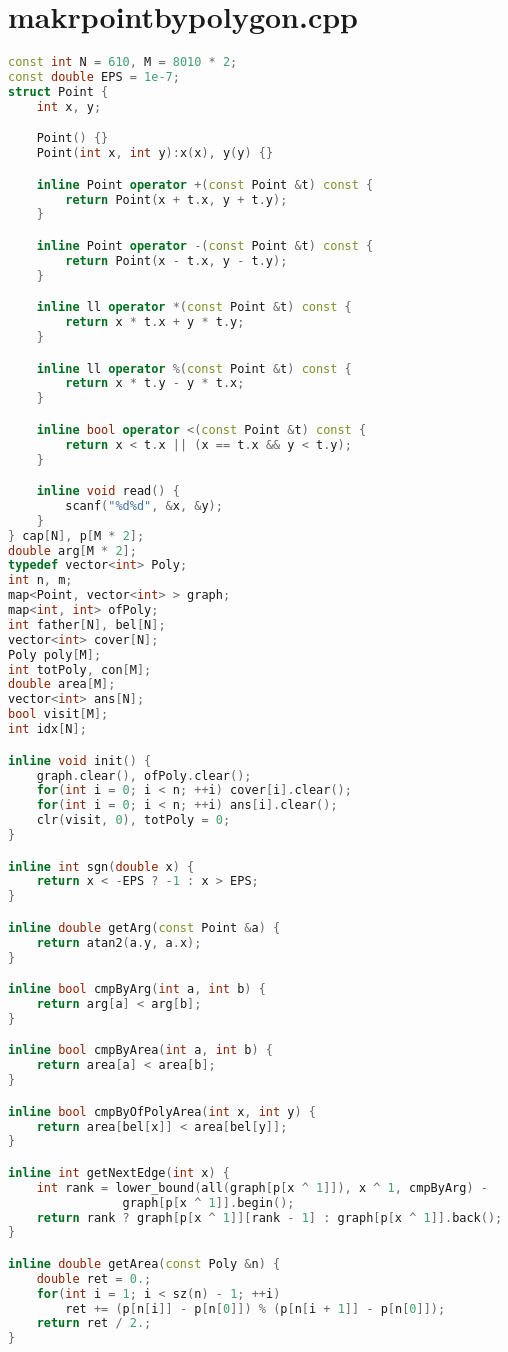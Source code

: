 \section{makrpointbypolygon.cpp}
\begin{lstlisting}[language=c++]
const int N = 610, M = 8010 * 2;
const double EPS = 1e-7;
struct Point {
	int x, y;

	Point() {}
	Point(int x, int y):x(x), y(y) {}

	inline Point operator +(const Point &t) const {
		return Point(x + t.x, y + t.y);
	}

	inline Point operator -(const Point &t) const {
		return Point(x - t.x, y - t.y);
	}

	inline ll operator *(const Point &t) const {
		return x * t.x + y * t.y;
	}

	inline ll operator %(const Point &t) const {
		return x * t.y - y * t.x;
	}

	inline bool operator <(const Point &t) const {
		return x < t.x || (x == t.x && y < t.y);
	}

	inline void read() {
		scanf("%d%d", &x, &y);
	}
} cap[N], p[M * 2];
double arg[M * 2];
typedef vector<int> Poly;
int n, m;
map<Point, vector<int> > graph;
map<int, int> ofPoly;
int father[N], bel[N];
vector<int> cover[N];
Poly poly[M];
int totPoly, con[M];
double area[M];
vector<int> ans[N];
bool visit[M];
int idx[N];

inline void init() {
	graph.clear(), ofPoly.clear();
	for(int i = 0; i < n; ++i) cover[i].clear();
	for(int i = 0; i < n; ++i) ans[i].clear();
	clr(visit, 0), totPoly = 0;
}

inline int sgn(double x) {
	return x < -EPS ? -1 : x > EPS;
}

inline double getArg(const Point &a) {
	return atan2(a.y, a.x);
}

inline bool cmpByArg(int a, int b) {
	return arg[a] < arg[b];
}

inline bool cmpByArea(int a, int b) {
	return area[a] < area[b];
}

inline bool cmpByOfPolyArea(int x, int y) {
	return area[bel[x]] < area[bel[y]];
}

inline int getNextEdge(int x) {
	int rank = lower_bound(all(graph[p[x ^ 1]]), x ^ 1, cmpByArg) - 
				graph[p[x ^ 1]].begin();
	return rank ? graph[p[x ^ 1]][rank - 1] : graph[p[x ^ 1]].back(); 
}

inline double getArea(const Poly &n) {
	double ret = 0.;
	for(int i = 1; i < sz(n) - 1; ++i)
		ret += (p[n[i]] - p[n[0]]) % (p[n[i + 1]] - p[n[0]]);
	return ret / 2.;
}


\end{lstlisting}
